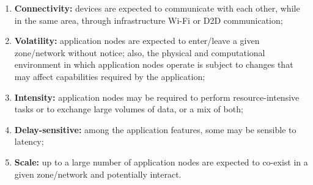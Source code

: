 \begin{enumerate}[label=C\arabic*]
	
	\item \textbf{Connectivity:} devices are expected to communicate with each other, while in the same area, through infrastructure Wi-Fi or D2D communication;
	
	\item \textbf{Volatility:} application nodes are expected to enter/leave a given zone/network without notice; also, the physical and computational environment in which application nodes operate is subject to changes that may affect capabilities required by the application;
	
	\item \textbf{Intensity:} application nodes may be required to perform resource-intensive tasks or to exchange large volumes of data, or a mix of both;
	
	\item \textbf{Delay-sensitive:} among the application features, some may be sensible to latency;
	
	\item \textbf{Scale:} up to a large number of application nodes are expected to co-exist in a given zone/network and potentially interact.
	
	
	
	
	
	
	
	
	

\end{enumerate}

